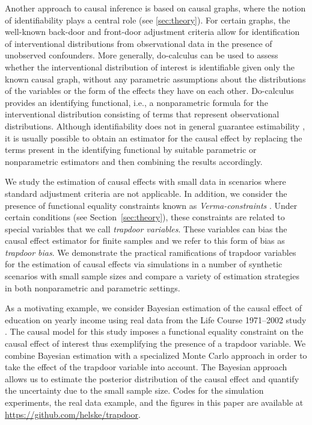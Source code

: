 \documentclass{statsoc}
\newcommand{\+}[1]{\ensuremath{\mathbf{#1}}}
\begin{document}
Another approach to causal inference is based on causal graphs, where the notion of identifiability plays a central role (see \autoref{sec:theory}). For certain graphs, the well-known back-door and front-door adjustment criteria \citep{Pearl1995} allow for identification of interventional distributions from observational data in the presence of unobserved confounders. More generally, do-calculus \citep{Pearl1995} can be used to assess whether the interventional distribution of interest is identifiable given only the known causal graph, without any parametric assumptions about the distributions of the variables or the form of the effects they have on each other. Do-calculus provides an identifying functional, i.e., a nonparametric formula for the interventional distribution consisting of terms that represent observational distributions. Although identifiability does not in general guarantee estimability \citep{maclaren2019}, it is usually possible to obtain an estimator for the causal effect by replacing the terms present in the identifying functional by suitable parametric or nonparametric estimators and then combining the results accordingly. 

We study the estimation of causal effects with small data in scenarios where standard adjustment criteria are not applicable. In addition, we consider the presence of functional equality constraints known as \emph{Verma-constraints} \citep{verma1990,TianPearl2002,robins1986}. Under certain conditions (see Section~\ref{sec:theory}), these constraints are related to special variables that we call \emph{trapdoor variables}. These variables can bias the causal effect estimator for finite samples and we refer to this form of bias as \emph{trapdoor bias}. We demonstrate the practical ramifications of trapdoor variables for the estimation of causal effects via simulations in a number of synthetic scenarios with small sample sizes and compare a variety of estimation strategies in both nonparametric and parametric settings.

As a motivating example, we consider Bayesian estimation of the causal effect of education on yearly income using real data from the Life Course 1971--2002 study \citep{fsd}. The causal model for this study imposes a functional equality constraint on the causal effect of interest thus exemplifying the presence of a trapdoor variable. We combine Bayesian estimation with a specialized Monte Carlo approach in order to take the effect of the trapdoor variable into account. The Bayesian approach allows us to estimate the posterior distribution of the causal effect and quantify the uncertainty due to the small sample size. Codes for the simulation experiments, the real data example, and the figures in this paper are available at  \url{https://github.com/helske/trapdoor}.
\end{document}
